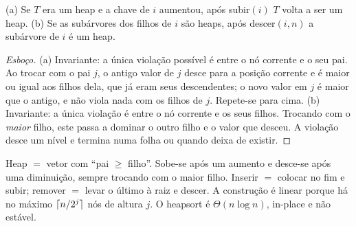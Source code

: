 \begin{prop}
(a) Se $T$ era um heap e a chave de $i$ aumentou, após subir$(i)$ $T$ volta a ser um heap. (b) Se as subárvores dos filhos de $i$ são heaps, após descer$(i,n)$ a subárvore de $i$ é um heap.
\end{prop}
\begin{proof}[Esboço]
(a) Invariante: a única violação possível é entre o nó corrente e o seu pai. Ao trocar com o pai $j$, o antigo valor de $j$ desce para a posição corrente e é maior ou igual aos filhos dela, que já eram seus descendentes; o novo valor em $j$ é maior que o antigo, e não viola nada com os filhos de $j$. Repete-se para cima. (b) Invariante: a única violação é entre o nó corrente e os seus filhos. Trocando com o \emph{maior} filho, este passa a dominar o outro filho e o valor que desceu. A violação desce um nível e termina numa folha ou quando deixa de existir.
\end{proof}

\begin{chave}
Heap $=$ vetor com ``pai $\ge$ filho''. Sobe-se após um aumento e desce-se após uma diminuição, sempre trocando com o maior filho. Inserir $=$ colocar no fim e subir; remover $=$ levar o último à raiz e descer. A construção é linear porque há no máximo $\lceil n/2^j\rceil$ nós de altura $j$. O heapsort é $\Theta(n\log n)$, in-place e não estável.
\end{chave}

